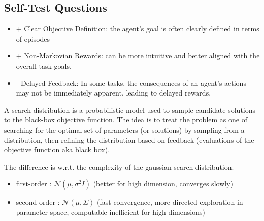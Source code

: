 \subsection{Self-Test Questions}
\begin{enumerate}
\begin{itemize}
    \item[] + Clear Objective Definition: the agent's goal is often clearly defined in terms of episodes
    \item[] + Non-Markovian Rewards: can be more intuitive and better aligned with the overall task goals.
    \item[] - Delayed Feedback: In some tasks, the consequences of an agent's actions may not be immediately apparent, leading to delayed rewards.
\end{itemize}

\newline

 \newline
A search distribution is a probabilistic model used to sample candidate solutions to the black-box objective 
function. The idea is to treat the problem as one of searching for the optimal set of parameters (or 
solutions) by sampling from a distribution, then refining the distribution based on feedback (evaluations of 
the objective function aka black box).

\newline The difference is w.r.t. the complexity of the gaussian search distribution.
\begin{itemize}
    \item first-order : $ \mathcal{N}(\mu,\sigma^2I)$ (better for high dimension, converges slowly)
    \item second order : $ \mathcal{N}(\mu,\Sigma)$ (fast convergence, more directed exploration in parameter space, computable inefficient for high dimensions)
\end{itemize}

\newline

\newline


\end{enumerate}

